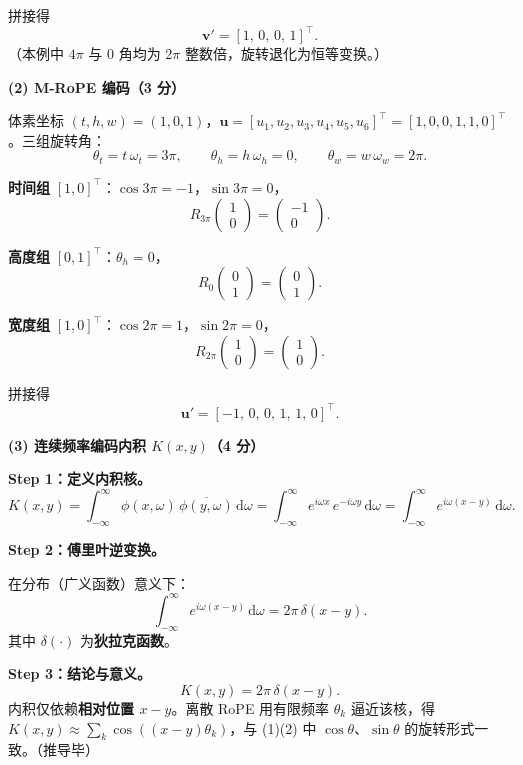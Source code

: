 \documentclass[11pt,a4paper]{article}
\begin{document}
拼接得
\[
\boxed{\mathbf{v}'=[1,\,0,\,0,\,1]^{\top}.}
\]
（本例中 $4\pi$ 与 $0$ 角均为 $2\pi$ 整数倍，旋转退化为恒等变换。）

\noindent\textbf{(2) M-RoPE 编码（3 分）}

体素坐标 $(t,h,w)=(1,0,1)$，$\mathbf{u}=[u_1,u_2,u_3,u_4,u_5,u_6]^{\top}=[1,0,0,1,1,0]^{\top}$。三组旋转角：
\[
\theta_t=t\,\omega_t=3\pi,\qquad
\theta_h=h\,\omega_h=0,\qquad
\theta_w=w\,\omega_w=2\pi.
\]

\textbf{时间组} $[1,0]^{\top}$：$\cos 3\pi=-1$，$\sin 3\pi=0$，
\[
R_{3\pi}\!\begin{pmatrix}1\\0\end{pmatrix}
=\begin{pmatrix}-1\\0\end{pmatrix}.
\]

\textbf{高度组} $[0,1]^{\top}$：$\theta_h=0$，
\[
R_{0}\!\begin{pmatrix}0\\1\end{pmatrix}
=\begin{pmatrix}0\\1\end{pmatrix}.
\]

\textbf{宽度组} $[1,0]^{\top}$：$\cos 2\pi=1$，$\sin 2\pi=0$，
\[
R_{2\pi}\!\begin{pmatrix}1\\0\end{pmatrix}
=\begin{pmatrix}1\\0\end{pmatrix}.
\]

拼接得
\[
\boxed{\mathbf{u}'=[-1,\,0,\,0,\,1,\,1,\,0]^{\top}.}
\]

\noindent\textbf{(3) 连续频率编码内积 $K(x,y)$（4 分）}

\textbf{Step 1：定义内积核。}
\[
K(x,y)=\int_{-\infty}^{\infty}\phi(x,\omega)\,\overline{\phi(y,\omega)}\,\mathrm{d}\omega
=\int_{-\infty}^{\infty}e^{i\omega x}\,e^{-i\omega y}\,\mathrm{d}\omega
=\int_{-\infty}^{\infty}e^{i\omega(x-y)}\,\mathrm{d}\omega.
\]

\textbf{Step 2：傅里叶逆变换。}

在分布（广义函数）意义下：
\[
\int_{-\infty}^{\infty}e^{i\omega(x-y)}\,\mathrm{d}\omega=2\pi\,\delta(x-y).
\]
其中 $\delta(\cdot)$ 为\textbf{狄拉克函数}。

\textbf{Step 3：结论与意义。}
\[
\boxed{K(x,y)=2\pi\,\delta(x-y).}
\]
内积仅依赖\textbf{相对位置 $x-y$}。离散 RoPE 用有限频率 $\theta_k$ 逼近该核，得 $K(x,y)\approx\sum_k\cos((x-y)\theta_k)$，与 (1)(2) 中 $\cos\theta$、$\sin\theta$ 的旋转形式一致。（推导毕）
\end{document}
